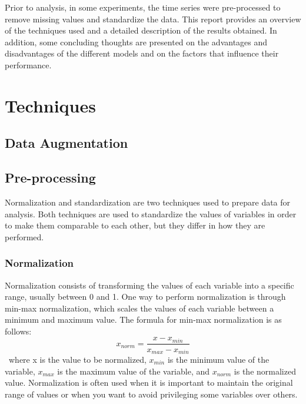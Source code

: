 \documentclass[11pt, oneside]{article}
\begin{document}
Prior to analysis, in some experiments, the time series were pre-processed to remove missing values and standardize the data. This report provides an overview of the techniques used and a detailed description of the results obtained. In addition, some concluding thoughts are presented on the advantages and disadvantages of the different models and on the factors that influence their performance.

\section{Techniques}
\subsection{Data Augmentation}

\subsection{Pre-processing}
Normalization and standardization are two techniques used to prepare data for analysis. Both techniques are used to standardize the values of variables in order to make them comparable to each other, but they differ in how they are performed.
\subsubsection{Normalization}
Normalization consists of transforming the values of each variable into a specific range, usually between 0 and 1. One way to perform normalization is through min-max normalization, which scales the values of each variable between a minimum and maximum value. The formula for min-max normalization is as follows:
\[ x_{norm} = \frac{x - x_{min}}{x_{max} - x_{min}} \]\
where x is the value to be normalized, $x_{min}$ is the minimum value of the variable, $x_{max}$ is the maximum value of the variable, and $x_{norm}$ is the normalized value.
Normalization is often used when it is important to maintain the original range of values or when you want to avoid privileging some variables over others.
\end{document}
